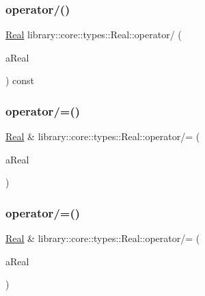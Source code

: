 \subsubsection{\texorpdfstring{operator/()}{operator/()}\hspace{0.1cm}{\footnotesize\ttfamily [2/2]}}
{\footnotesize\ttfamily \hyperlink{classlibrary_1_1core_1_1types_1_1_real}{Real} library\+::core\+::types\+::\+Real\+::operator/ (\begin{DoxyParamCaption}\item[{const \hyperlink{classlibrary_1_1core_1_1types_1_1_real_a9c5c8826b7e5a8e39544d23fea6c0e1c}{Real\+::\+Value\+Type} \&}]{a\+Real }\end{DoxyParamCaption}) const}

\mbox{\label{classlibrary_1_1core_1_1types_1_1_real_adc661a93f109f10500738a77439c975d}} 
\subsubsection{\texorpdfstring{operator/=()}{operator/=()}\hspace{0.1cm}{\footnotesize\ttfamily [1/2]}}
{\footnotesize\ttfamily \hyperlink{classlibrary_1_1core_1_1types_1_1_real}{Real} \& library\+::core\+::types\+::\+Real\+::operator/= (\begin{DoxyParamCaption}\item[{const \hyperlink{classlibrary_1_1core_1_1types_1_1_real}{Real} \&}]{a\+Real }\end{DoxyParamCaption})}

\mbox{\label{classlibrary_1_1core_1_1types_1_1_real_a6a9a6530460f746c7e7fdbba3b6932fe}} 
\subsubsection{\texorpdfstring{operator/=()}{operator/=()}\hspace{0.1cm}{\footnotesize\ttfamily [2/2]}}
{\footnotesize\ttfamily \hyperlink{classlibrary_1_1core_1_1types_1_1_real}{Real} \& library\+::core\+::types\+::\+Real\+::operator/= (\begin{DoxyParamCaption}\item[{const \hyperlink{classlibrary_1_1core_1_1types_1_1_real_a9c5c8826b7e5a8e39544d23fea6c0e1c}{Real\+::\+Value\+Type} \&}]{a\+Real }\end{DoxyParamCaption})}

